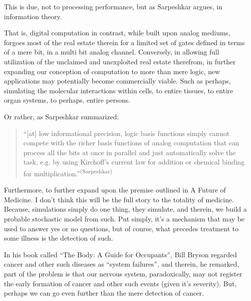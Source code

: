 This is due, not to processing performance, but as Sarpeshkar argues, in information theory.

That is, digital computation in contrast, while built upon analog mediums, forgoes most of the real estate therein for a limited set of gates defined in terms of a mere bit, in a multi bit analog channel. Conversely, in allowing full utilization of the unclaimed and unexploited real estate therefrom, in further expanding our conception of computation to more than mere logic, new applications may potentially become commercially viable. Such as perhaps, simulating the molecular interactions within cells, to entire tissues, to entire organ systems, to perhaps, entire persons.

Or rather, as Sarpeshkar summarized:

\begin{quotation}
    ``[at] low informational precision, logic basis functions simply cannot compete with the richer basis functions of analog computation that can process all the bits at once in parallel and just automatically solve the task, e.g. by using Kirchoff’s current law for addition or chemical binding for multiplication.''\textsuperscript{(Sarpeshkar)}
\end{quotation}

Furthermore, to further expand upon the premise outlined in A Future of Medicine. I don't think this will be the full story to the totality of medicine. Because, simulations simply do one thing, they simulate, and therein, we build a probable stochastic model from such. Put simply, it's a mechanism that may be used to answer yes or no questions, but of course, what precedes treatment to some illness is the detection of such. 

In his book called ``The Body: A Guide for Occupants'', Bill Bryson regarded cancer and other such diseases as ``system failures'', and therein, he remarked, part of the problem is that our nervous system, paradoxically, may not register the early formation of cancer and other such events (given it's severity). But, perhaps we can go even further than the mere detection of cancer.

